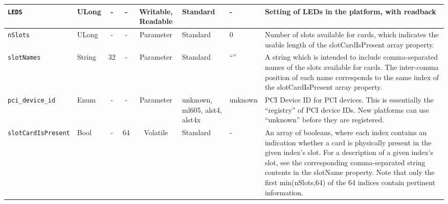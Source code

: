 \documentclass{article}
\begin{document}
\begin{landscape}
\begin{scriptsize}
\begin{tabular}{|p{3cm}|p{1.5cm}|c|c|c|p{1.5cm}|p{1cm}|p{6cm}|}
			\hline
			\verb+LEDS+        & ULong  & -              & -               & Writable, Readable & Standard    & -       & Setting of LEDs in the platform, with readback                                \\
			\hline
			\verb+nSlots+      & ULong  & -              & -               & Parameter & Standard & 0 & Number of slots available for cards, which indicates the usable length of the slotCardIsPresent array property. \\
			\hline
			\verb+slotNames+   & String & 32             & -               & Parameter & Standard & ``'' & A string which is intended to include comma-separated names of the slots available for cards. The inter-comma position of each name corresponds to the same index of the slotCardIsPresent array property. \\
			\hline
			\verb+pci_device_id+ & Enum & -              & -               & Parameter & unknown, ml605, alst4, alst4x & unknown & PCI Device ID for PCI devices. This is essentially the ``registry'' of PCI device IDs. New platforms can use ``unknown'' before they are registered. \\
			\hline
			\verb+slotCardIsPresent+ & Bool & -          & 64              & Volatile           & Standard    & -       & An array of booleans, where each index contains an indication whether a card is physically present in the given index's slot. For a description of a given index's slot, see the corresponding comma-separated string contents in the slotName property. Note that only the first min(nSlots,64) of the 64 indices contain pertinent information. \\
			\hline

		\end{tabular}
	\end{scriptsize}

\end{landscape}
\end{document}
